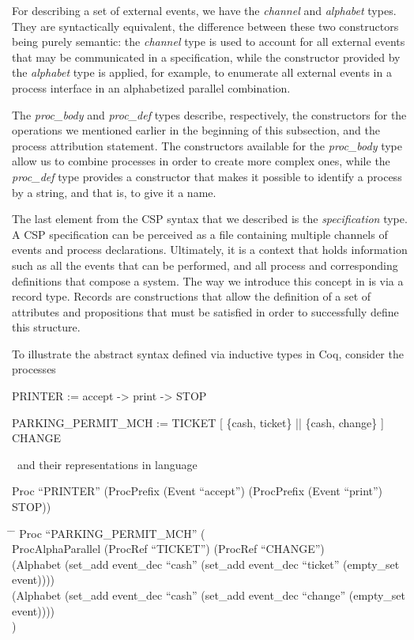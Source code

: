 For describing a set of external events, we have the \emph{channel} and \emph{alphabet} types. They are syntactically equivalent, the difference between these two constructors being purely semantic: the \emph{channel} type is used to account for all external events that may be communicated in a \CSPcoq{} specification, while the constructor provided by the \emph{alphabet} type is applied, for example, to enumerate all external events in a process interface in an alphabetized parallel combination.

The \emph{proc\_body} and \emph{proc\_def} types describe, respectively, the constructors for the operations we mentioned earlier in the beginning of this subsection, and the process attribution statement. The constructors available for the \emph{proc\_body} type allow us to combine processes in order to create more complex ones, while the \emph{proc\_def} type provides a constructor that makes it possible to identify a process by a string, and that is, to give it a name.

The last element from the CSP syntax that we described is the \emph{specification} type. A CSP specification can be perceived as a file containing multiple channels of events and process declarations. Ultimately, it is a context that holds information such as all the events that can be performed, and all process and corresponding definitions that compose a system. The way we introduce this concept in \CSPcoq{} is via a record type. Records are constructions that allow the definition of a set of attributes and propositions that must be satisfied in order to successfully define this structure.

To illustrate the abstract syntax defined via inductive types in Coq, consider the \CSPM{} processes
\
\begin{flushleft}
	PRINTER := accept -> print -> STOP
	
	PARKING\_PERMIT\_MCH := TICKET [ \{cash, ticket\} || \{cash, change\} ] CHANGE
\end{flushleft}
\
and their representations in \CSPcoq{} language

\begin{flushleft}
	Proc ``PRINTER'' (ProcPrefix (Event ``accept'') (ProcPrefix (Event ``print'') STOP))
\end{flushleft}

\begin{tabbing}
	\hspace*{1em}\= \hspace*{2em} \= \kill
	Proc ``PARKING\_PERMIT\_MCH'' (\\
	\>	ProcAlphaParallel (ProcRef ``TICKET'') (ProcRef ``CHANGE'')\\
	\>	(Alphabet (set\_add event\_dec ``cash'' (set\_add event\_dec ``ticket'' (empty\_set event))))\\
	\>	(Alphabet (set\_add event\_dec ``cash'' (set\_add event\_dec ``change'' (empty\_set event))))\\
	)
\end{tabbing}

